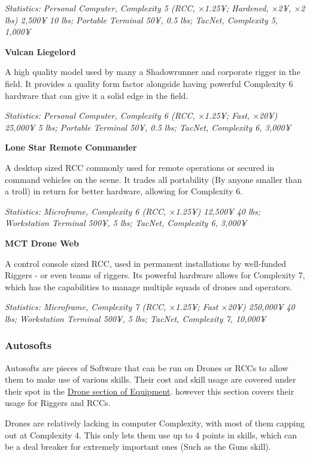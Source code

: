 \begin{multicols*}{3}
	\textcolor{OliveGreen}{\textit{Statistics: Personal Computer, Complexity 5 (RCC, \(\times\)1.25¥; Hardened, \(\times\)2¥, \(\times\)2 lbs) 2,500¥ 10 lbs; Portable Terminal 50¥, 0.5 lbs; TacNet, Complexity 5, 1,000¥}}
	
	\textbf{Vulcan Liegelord}
	
	A high quality model used by many a Shadowrunner and corporate rigger in the field. It provides a quality form factor alongside having powerful Complexity 6 hardware that can give it a solid edge in the field.
	
	\textcolor{OliveGreen}{\textit{Statistics: Personal Computer, Complexity 6 (RCC, \(\times\)1.25¥; Fast, \(\times\)20¥) 25,000¥ 5 lbs; Portable Terminal 50¥, 0.5 lbs; TacNet, Complexity 6, 3,000¥}}
	
	\textbf{Lone Star Remote Commander}
	
	A desktop sized RCC commonly used for remote operations or secured in command vehicles on the scene. It trades all portability (By anyone smaller than a troll) in return for better hardware, allowing for Complexity 6.
	
	\textcolor{OliveGreen}{\textit{Statistics: Microframe, Complexity 6 (RCC, \(\times\)1.25¥) 12,500¥ 40 lbs; Workstation Terminal 500¥, 5 lbs; TacNet, Complexity 6, 3,000¥}}
	
	\textbf{MCT Drone Web}
	
	A control console sized RCC, used in permanent installations by well-funded Riggers - or even teams of riggers. Its powerful hardware allows for Complexity 7, which has the capabilities to manage multiple squads of drones and operators.
	
	\textcolor{OliveGreen}{\textit{Statistics: Microframe, Complexity 7 (RCC, \(\times\)1.25¥; Fast \(\times\)20¥) 250,000¥ 40 lbs; Workstation Terminal 500¥, 5 lbs; TacNet, Complexity 7, 10,000¥}}
	
	\subsubsection{Autosofts}
	Autosofts are pieces of Software that can be run on Drones or RCCs to allow them to make use of various skills. Their cost and skill usage are covered under their spot in the \hyperref[drones]{Drone section of Equipment}. however this section covers their usage for Riggers and RCCs.
	
	Drones are relatively lacking in computer Complexity, with most of them capping out at Complexity 4. This only lets them use up to 4 points in skills, which can be a deal breaker for extremely important ones (Such as the Guns skill).
	

\end{multicols*}
